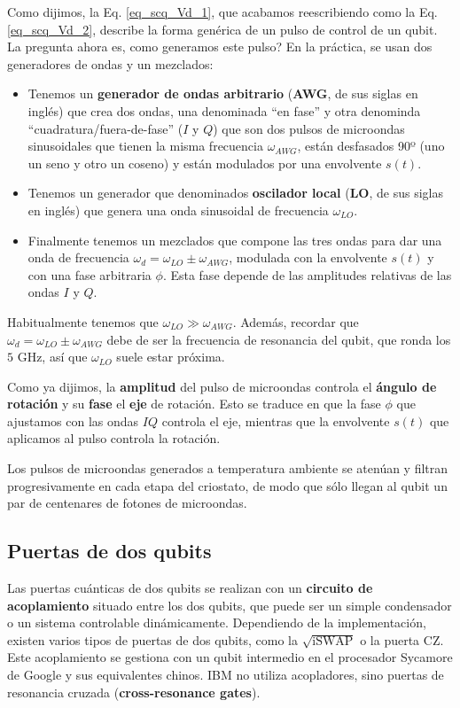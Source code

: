 Como dijimos, la Eq. \ref{eq_scq_Vd_1}, que acabamos reescribiendo como la Eq. \ref{eq_scq_Vd_2}, describe la forma genérica de un pulso de control de un qubit. La pregunta ahora es, como generamos este pulso? En la práctica, se usan dos generadores de ondas y un mezclados:
\begin{itemize}
	\item Tenemos un \textbf{generador de ondas arbitrario} (\textbf{AWG}, de sus siglas en inglés) que crea dos ondas, una denominada ``en fase'' y otra denominda ``cuadratura/fuera-de-fase'' ($I$ y $Q$) que son dos pulsos de microondas sinusoidales que tienen la misma frecuencia $\omega_{AWG}$, están desfasados 90º (uno un seno y otro un coseno) y están modulados por una envolvente $s(t)$. 
	\item Tenemos un generador que denominados \textbf{oscilador local} (\textbf{LO}, de sus siglas en inglés) que genera una onda sinusoidal de frecuencia $\omega_{LO}$.
	\item Finalmente tenemos un mezclados que compone las tres ondas para dar una onda de frecuencia $\omega_d = \omega_{LO} \pm \omega_{AWG}$, modulada con la envolvente $s(t)$ y con una fase arbitraria $\phi$. Esta fase depende de las amplitudes relativas de las ondas $I$ y $Q$. 
\end{itemize}
Habitualmente tenemos que $\omega_{LO} \gg \omega_{AWG}$. Además, recordar que $\omega_d = \omega_{LO} \pm \omega_{AWG}$ debe de ser la frecuencia de resonancia del qubit, que ronda los $5$ GHz, así que $\omega_{LO}$ suele estar próxima.

Como ya dijimos, la \textbf{amplitud} del pulso de microondas controla el \textbf{ángulo de rotación} y su \textbf{fase} el \textbf{eje} de rotación. Esto se traduce en que la fase $\phi$ que ajustamos con las ondas $IQ$ controla el eje, mientras que la envolvente $s(t)$ que aplicamos al pulso controla la rotación.

Los pulsos de microondas generados a temperatura ambiente se atenúan y filtran progresivamente en cada etapa del criostato, de modo que sólo llegan al qubit un par de centenares de fotones de microondas.


\subsection{Puertas de dos qubits}

Las puertas cuánticas de dos qubits se realizan con un \textbf{circuito de acoplamiento} situado entre los dos qubits, que puede ser un simple condensador o un sistema controlable dinámicamente. Dependiendo de la implementación, existen varios tipos de puertas de dos qubits, como la $\sqrt{\text{iSWAP}}$ o la puerta CZ. Este acoplamiento se gestiona con un qubit intermedio en el procesador Sycamore de Google y sus equivalentes chinos. IBM no utiliza acopladores, sino puertas de resonancia cruzada (\textbf{cross-resonance gates}).



